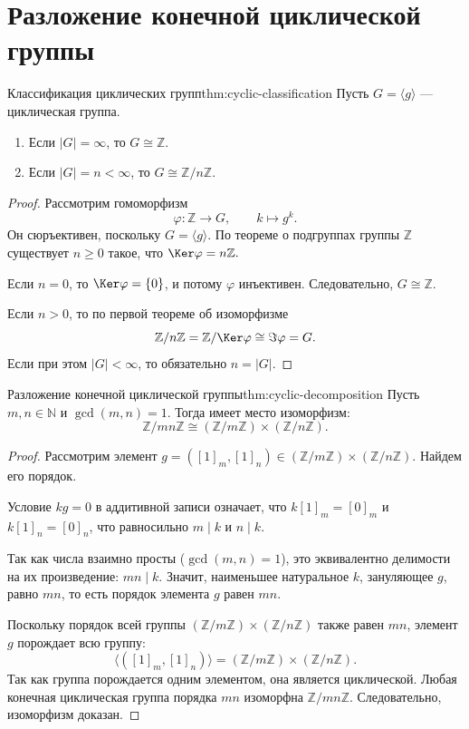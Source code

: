 
\section{Разложение конечной циклической группы}

\begin{Theorem}{Классификация циклических групп}{thm:cyclic-classification}
	Пусть $G=\langle g\rangle$ --- циклическая группа.
	\begin{enumerate}
		\item Если $|G|=\infty$, то $G\cong \mathbb{Z}$.
		\item Если $|G|=n<\infty$, то $G\cong \mathbb{Z}/n\mathbb{Z}$.
	\end{enumerate}
\end{Theorem}

\begin{proof}
	Рассмотрим гомоморфизм
	\[
	\varphi\colon \mathbb{Z} \to G, \qquad k\mapsto g^k.
	\]
	Он сюръективен, поскольку $G=\langle g\rangle$. По теореме о подгруппах группы $\mathbb{Z}$ существует $n\ge 0$ такое, что $\Ker\varphi=n\mathbb{Z}.$
	
	Если $n=0$, то $\Ker\varphi=\{0\}$, и потому $\varphi$ инъективен. Следовательно, $G\cong \mathbb{Z}$.
	
	Если $n>0$, то по первой теореме об изоморфизме
	\[
	\mathbb{Z}/n\mathbb{Z} = \mathbb{Z}/\Ker\varphi \cong \Im\varphi = G.
	\]
	Если при этом $|G|<\infty$, то обязательно $n=|G|$.
\end{proof}

\begin{Theorem}{Разложение конечной циклической группы}{thm:cyclic-decomposition}
	Пусть $m, n \in \mathbb{N}$ и $\gcd(m, n) = 1$. Тогда имеет место изоморфизм:
	\[
	\mathbb{Z}/mn\mathbb{Z} \cong (\mathbb{Z}/m\mathbb{Z}) \times (\mathbb{Z}/n\mathbb{Z}).
	\]
\end{Theorem}

\begin{proof}
	Рассмотрим элемент $g = ([1]_m, [1]_n) \in (\mathbb{Z}/m\mathbb{Z}) \times (\mathbb{Z}/n\mathbb{Z})$. Найдем его порядок.
	
	Условие $kg = 0$ в аддитивной записи означает, что $k[1]_m = [0]_m$ и $k[1]_n = [0]_n$, что равносильно $m \mid k$ и $n \mid k$. 
	
	Так как числа взаимно просты ($\gcd(m, n) = 1$), это эквивалентно делимости на их произведение: $mn \mid k$.
	Значит, наименьшее натуральное $k$, зануляющее $g$, равно $mn$, то есть порядок элемента $g$ равен $mn$.
	
	Поскольку порядок всей группы $(\mathbb{Z}/m\mathbb{Z}) \times (\mathbb{Z}/n\mathbb{Z})$ также равен $mn$, элемент $g$ порождает всю группу:
	\[
	\langle ([1]_m, [1]_n) \rangle = (\mathbb{Z}/m\mathbb{Z}) \times (\mathbb{Z}/n\mathbb{Z}).
	\]
	Так как группа порождается одним элементом, она является циклической. Любая конечная циклическая группа порядка $mn$ изоморфна $\mathbb{Z}/mn\mathbb{Z}$. Следовательно, изоморфизм доказан.
\end{proof}